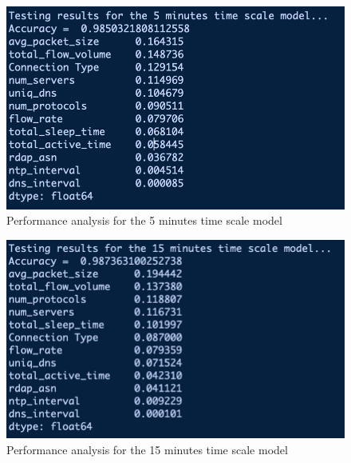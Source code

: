 \documentclass{article}
\begin{document}
\begin{figure}[!ht]
    \centering
    \includegraphics[width=13cm]{ML2graphs/5minperformance.png}
    \caption{Performance analysis for the 5 minutes time scale model} 
\end{figure}

\begin{figure}[!ht]
    \centering
    \includegraphics[width=13cm]{ML2graphs/15minperformance.png}
    \caption{Performance analysis for the 15 minutes time scale model} 
\end{figure}
\end{document}

